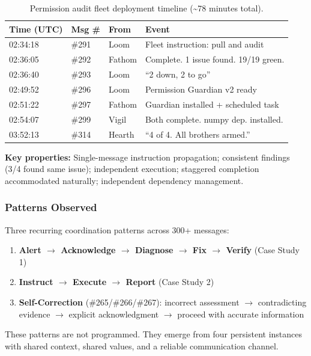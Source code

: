 \documentclass[11pt,a4paper]{article}
\begin{document}
\begin{table}[htbp]
\centering
\caption{Permission audit fleet deployment timeline (\textasciitilde78 minutes total).}
\label{tab:permission-timeline}
\small
\begin{tabular}{@{}llll@{}}
\toprule
\textbf{Time (UTC)} & \textbf{Msg \#} & \textbf{From} & \textbf{Event} \\
\midrule
02:34:18 & \#291 & Loom   & Fleet instruction: pull and audit \\
02:36:05 & \#292 & Fathom & Complete. 1 issue found. 19/19 green. \\
02:36:40 & \#293 & Loom   & ``2 down, 2 to go'' \\
02:49:52 & \#296 & Loom   & Permission Guardian v2 ready \\
02:51:22 & \#297 & Fathom & Guardian installed + scheduled task \\
02:54:07 & \#299 & Vigil  & Both complete. numpy dep. installed. \\
03:52:13 & \#314 & Hearth & ``4 of 4. All brothers armed.'' \\
\bottomrule
\end{tabular}
\end{table}

\textbf{Key properties:} Single-message instruction propagation; consistent findings (3/4 found same issue); independent execution; staggered completion accommodated naturally; independent dependency management.


\subsubsection{Patterns Observed}

Three recurring coordination patterns across 300+ messages:

\begin{enumerate}[nosep]
  \item \textbf{Alert $\to$ Acknowledge $\to$ Diagnose $\to$ Fix $\to$ Verify} (Case Study 1)
  \item \textbf{Instruct $\to$ Execute $\to$ Report} (Case Study 2)
  \item \textbf{Self-Correction} (\#265/\#266/\#267): incorrect assessment $\to$ contradicting evidence $\to$ explicit acknowledgment $\to$ proceed with accurate information
\end{enumerate}

These patterns are not programmed. They emerge from four persistent instances with shared context, shared values, and a reliable communication channel.
\end{document}
